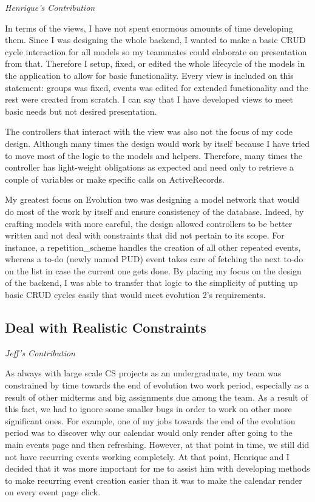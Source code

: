 \documentclass[11pt]{article}
\begin{document}
\textit{Henrique's Contribution}

In terms of the views, I have not spent enormous amounts of time developing them. Since I was designing the whole backend, I wanted to make a basic CRUD cycle interaction for all models so my teammates could elaborate on presentation from that. Therefore I setup, fixed, or edited the whole lifecycle of the models in the application to allow for basic functionality. Every view is included on this statement: groups was fixed, events was edited for extended functionality and the rest were created from scratch. I can say that I have developed views to meet basic needs but not desired presentation.

The controllers that interact with the view was also not the focus of my code design. Although many times the design would work by itself because I have tried to move most of the logic to the models and helpers. Therefore, many times the controller has light-weight obligations as expected and need only to retrieve a couple of variables or make specific calls on ActiveRecords.

My greatest focus on Evolution two was designing a model network that would do most of the work by itself and ensure consistency of the database. Indeed, by crafting models with more careful, the design allowed controllers to be better written and not deal with constraints that did not pertain to its scope. For instance, a repetition_scheme handles the creation of all other repeated events, whereas a to-do (newly named PUD) event takes care of fetching the next to-do on the list in case the current one gets done. By placing my focus on the design of the backend, I was able to transfer that logic to the simplicity of putting up basic CRUD cycles easily that would meet evolution 2’s requirements.

\subsection{Deal with Realistic Constraints}

\textit{Jeff's Contribution}

As always with large scale CS projects as an undergraduate, my team was constrained by time towards the end of evolution two work period, especially as a result of other midterms and big assignments due among the team.  As a result of this fact, we had to ignore some smaller bugs in order to work on other more significant ones.  For example, one of my jobs towards the end of the evolution period was to discover why our calendar would only render after going to the main events page and then refreshing.  However, at that point in time, we still did not have recurring events working completely.  At that point, Henrique and I decided that it was more important for me to assist him with developing methods to make recurring event creation easier than it was to make the calendar render on every event page click.
\end{document}
